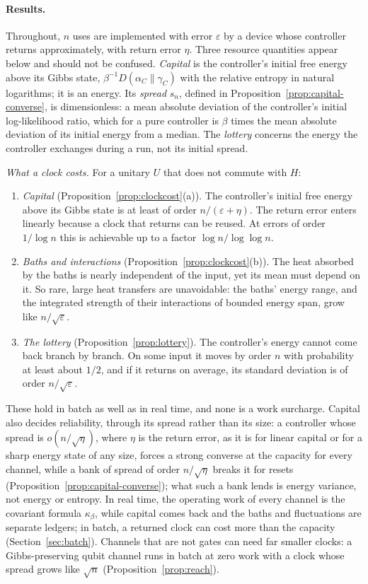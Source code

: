 \documentclass[11pt]{article}
\theoremstyle{definition}
\theoremstyle{remark}
\newcommand{\Trt}{\kappa_\beta}
\begin{document}
\paragraph{Results.} Throughout, $n$ uses are implemented with error $\varepsilon$ by a device whose controller returns approximately, with return error $\eta$. Three resource quantities appear below and should not be confused. \emph{Capital} is the controller's initial free energy above its Gibbs state, $\beta^{-1}D(\alpha_C\|\gamma_C)$ with the relative entropy in natural logarithms; it is an energy. Its \emph{spread} $s_n$, defined in Proposition~\ref{prop:capital-converse}, is dimensionless: a mean absolute deviation of the controller's initial log-likelihood ratio, which for a pure controller is $\beta$ times the mean absolute deviation of its initial energy from a median. The \emph{lottery} concerns the energy the controller exchanges during a run, not its initial spread.

\emph{What a clock costs.} For a unitary $U$ that does not commute with $H$:
\begin{enumerate}[label=(\roman*)]
\item \emph{Capital} (Proposition~\ref{prop:clockcost}(a)). The controller's initial free energy above its Gibbs state is at least of order $n/(\varepsilon+\eta)$. The return error enters linearly because a clock that returns can be reused. At errors of order $1/\log n$ this is achievable up to a factor $\log n/\log\log n$.
\item \emph{Baths and interactions} (Proposition~\ref{prop:clockcost}(b)). The heat absorbed by the baths is nearly independent of the input, yet its mean must depend on it. So rare, large heat transfers are unavoidable: the baths' energy range, and the integrated strength of their interactions of bounded energy span, grow like $n/\sqrt\varepsilon$.
\item \emph{The lottery} (Proposition~\ref{prop:lottery}). The controller's energy cannot come back branch by branch. On some input it moves by order $n$ with probability at least about $1/2$, and if it returns on average, its standard deviation is of order $n/\sqrt\varepsilon$.
\end{enumerate}
These hold in batch as well as in real time, and none is a work surcharge. Capital also decides reliability, through its spread rather than its size: a controller whose spread is $o(n/\sqrt\eta)$, where $\eta$ is the return error, as it is for linear capital or for a sharp energy state of any size, forces a strong converse at the capacity for every channel, while a bank of spread of order $n/\sqrt\eta$ breaks it for resets (Proposition~\ref{prop:capital-converse}); what such a bank lends is energy variance, not energy or entropy. In real time, the operating work of every channel is the covariant formula $\Trt$, while capital comes back and the baths and fluctuations are separate ledgers; in batch, a returned clock can cost more than the capacity (Section~\ref{sec:batch}). Channels that are not gates can need far smaller clocks: a Gibbs-preserving qubit channel runs in batch at zero work with a clock whose spread grows like $\sqrt n$ (Proposition~\ref{prop:reach}).
\end{document}

